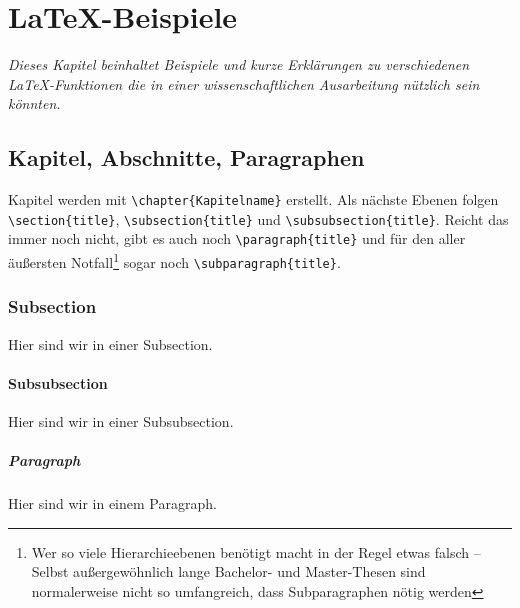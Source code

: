 \chapter{\LaTeX-Beispiele}
\label{sec:anhang:latex-beispiele}
	\emph{Dieses Kapitel beinhaltet Beispiele und kurze Erklärungen zu verschiedenen \LaTeX-Funktionen die in einer wissenschaftlichen Ausarbeitung nützlich sein könnten.%
	 }
		
	\section{Kapitel, Abschnitte, Paragraphen}\label{sec:chapter-section-paragraph}
		Kapitel werden mit \lstinline|\chapter{Kapitelname}| erstellt.
		Als nächste Ebenen folgen \lstinline|\section{title}|, \lstinline|\subsection{title}| und \lstinline|\subsubsection{title}|.
		Reicht das immer noch nicht, gibt es auch noch \lstinline|\paragraph{title}| und für den aller äußersten Notfall\footnote{Wer so viele Hierarchieebenen benötigt macht in der Regel etwas falsch -- Selbst außergewöhnlich lange Bachelor- und Master-Thesen sind normalerweise nicht so umfangreich, dass Subparagraphen nötig werden} sogar noch \lstinline|\subparagraph{title}|.
		\begin{vorlagenbeispiel}
			\subsection{Subsection}
				Hier sind wir in einer Subsection.
				\subsubsection{Subsubsection}
					Hier sind wir in einer Subsubsection.
					\paragraph{Paragraph}
						Hier sind wir in einem Paragraph.
		\end{vorlagenbeispiel}
		
